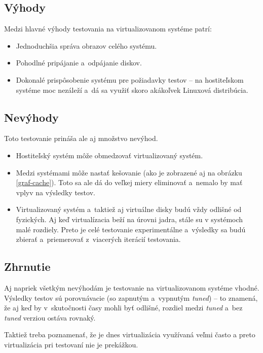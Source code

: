 \subsection{Výhody}

Medzi hlavné výhody testovania na virtualizovanom systéme patrí:

\begin{itemize}
    \item Jednoduchšia správa obrazov celého systému.
    \item Pohodlné pripájanie a~odpájanie diskov.
    \item Dokonalé prispôsobenie systému pre požiadavky testov -- na
    hostiteľskom systéme moc nezáleží a~dá sa využiť skoro akákoľvek Linuxová
    distribúcia.
\end{itemize}

\subsection{Nevýhody}

Toto testovanie prináša ale aj množstvo nevýhod. 

\begin{itemize}
    \item Hostiteľský systém môže obmedzovať virtualizovaný systém.
    \item Medzi systémami môže nastať kešovanie (ako je zobrazené aj na obrázku
    \ref{graf-cache}). Toto sa ale dá do veľkej miery eliminovať a~nemalo by
    mať vplyv na výsledky testov.
    \item Virtualizovaný systém a~taktiež aj virtuálne disky budú vždy odlišné
    od fyzických. Aj keď virtualízacia beží na úrovni jadra, stále su v
    systémoch malé rozdiely. Preto je celé testovanie experimentálne a~výsledky
    sa budú zbierať a~priemerovať z~viacerých iterácií testovania.
\end{itemize}

\subsection{Zhrnutie}

Aj napriek všetkým nevýhodám je testovanie na virtualizovanom systéme vhodné.
Výsledky testov sú porovnávacie (so zapnutým a~vypnutým \emph{tuned}) -- to
znamená, že aj keď by v~skutočnosti časy mohli byť odlišné, rozdiel medzi
\emph{tuned} a~bez \emph{tuned} verziou ostáva rovnaký.

Taktiež treba poznamenať, že je dnes virtualizácia využívaná veľmi často a
preto virtualizácia pri testovaní nie je prekážkou.

